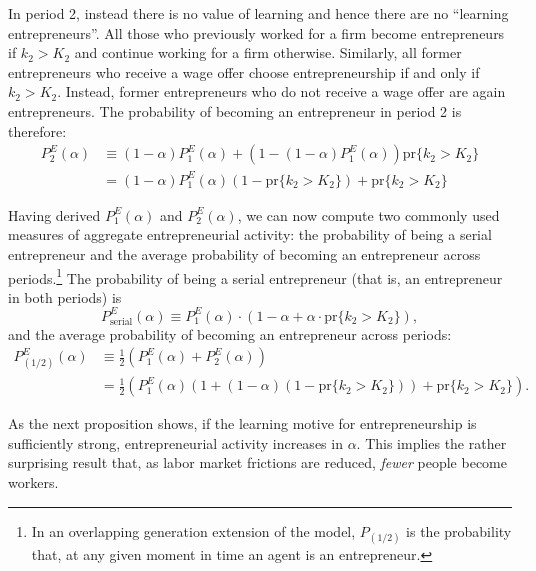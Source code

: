 \documentclass[12pt,american]{paper}
\theoremstyle{remark}
\begin{document}
In period 2, instead there is no value of learning and hence there are no ``learning entrepreneurs''. All those who previously worked for a firm become entrepreneurs if $k_2>K_2$ and continue working for a firm otherwise. Similarly, all former entrepreneurs who receive a wage offer choose entrepreneurship if and only if $k_2>K_2$. Instead, former entrepreneurs who do not receive a wage offer are again entrepreneurs. The probability of becoming an entrepreneur in period 2 is therefore:
\begin{align*}
P_2^E(\alpha)&\equiv (1-\alpha)P_1^E(\alpha)+(1-(1-\alpha)P_1^E(\alpha))\mbox{pr}\{k_2>K_2\}\\
&=(1-\alpha )P_1^E(\alpha)(1-\mbox{pr}\{k_2>K_2\})+\mbox{pr}\{k_2>K_2\}
\end{align*}

Having derived $P_1^E(\alpha)$ and $P_2^E(\alpha)$, we can now compute two commonly used measures of aggregate entrepreneurial activity: the probability of being a serial entrepreneur and the average probability of becoming an entrepreneur across periods.\footnote{In an overlapping generation extension of the model, $P_{(1/2)}$ is the probability that, at any given moment in time an agent is an entrepreneur.}
The probability of being a serial entrepreneur (that is, an entrepreneur in both periods) is
$$
P_{\mbox{serial}}^E(\alpha)\equiv P_1^E(\alpha) \cdot (1-\alpha +  \alpha \cdot \mbox{pr}\{k_2>K_2\}),
$$
and the average probability of becoming an entrepreneur across periods:
\begin{align*}
P_{(1/2)}^E(\alpha)&\equiv \frac{1}{2} \left( P_1^E(\alpha) + P_2^E(\alpha) \right)\\
&= \frac{1}{2} \left( P_1^E(\alpha)(1+(1-\alpha)(1-\mbox{pr}\{k_2>K_2\})) +\mbox{pr}\{k_2>K_2\}  \right). 
\end{align*} 

As the next proposition shows, if the learning motive for entrepreneurship is sufficiently strong, entrepreneurial activity increases in $\alpha$. This implies the rather surprising result that, as labor market frictions are reduced, \emph{fewer} people become workers.

\end{document}
